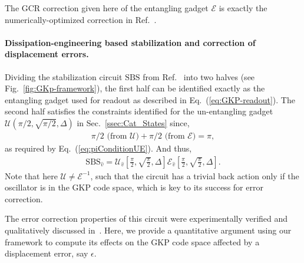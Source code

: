 \documentclass[aps,prx,showpacs,notitlepage,twocolumn,superscriptaddress,nofootinbib,preprintnumbers,floatfix,10pt, longbibliography]{revtex4-2}
\begin{document}
The GCR correction given here of the entangling gadget $\mathcal E$ is exactly the numerically-optimized correction in Ref.~\cite{hastrup2021improved}.
\paragraph{Dissipation-engineering based stabilization and correction of displacement errors.} 
Dividing the stabilization circuit $\mathrm{SBS}$ from Ref.~\cite{royer2020stabilization} into two halves (see Fig.~\ref{fig:GKp-framework}), the first half can be identified exactly as the entangling gadget used for readout as described in Eq.~(\ref{eq:GKP-readout}). The second half satisfies the constraints identified for the un-entangling gadget $\mathcal{U}(\pi/2,\sqrt{\pi/2},\Delta)$ in Sec.~\ref{ssec:Cat_States} since,
\begin{align}
  \pi/2\textrm{ (from }\mathcal{U})+\pi/2\textrm{ (from }\mathcal{E})=\pi,
\end{align}
as required by Eq.~(\ref{eq:piConditionUE}). And thus, 
\begin{align}
\mathrm{SBS}_{\hat v}=\mathcal{U}_{\hat v}\left[\frac{\pi}{2},\sqrt{\frac{\pi}{2}},\Delta\right]\mathcal{E}_{\hat v}\left[\frac{\pi}{2},\sqrt{\frac{\pi}{2}},\Delta\right].  
\end{align}
Note that here $\mathcal{U}\neq\mathcal{E}^{-1}$, such that the circuit has a trivial back action only if the oscillator is in the GKP code space, which is key to its success for error correction.

The error correction properties of this circuit were experimentally verified and qualitatively discussed in~\cite{sivak2023real}. Here, we provide a quantitative argument using our framework to compute its effects on the GKP code space affected by a displacement error, say $\epsilon$. 
\end{document}

